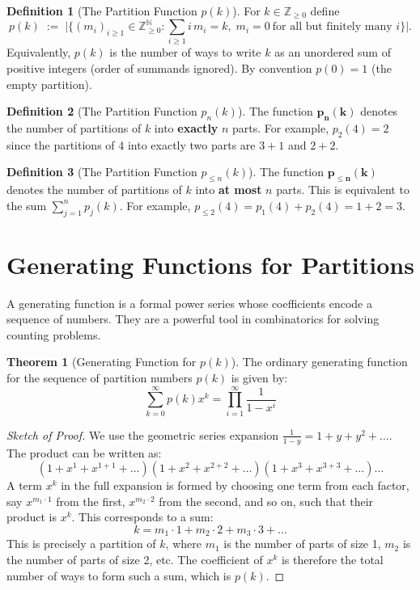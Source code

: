 \documentclass{article}
\theoremstyle{definition}
\newtheorem{definition}{Definition}
\newtheorem{theorem}{Theorem}
\begin{document}
\begin{definition}[The Partition Function $p(k)$]
  For $k\in\mathbb{Z}_{\ge0}$ define
  \[
    p(k)\;:=\;\Bigg|\Big\{(m_i)_{i\ge1}\in\mathbb{Z}_{\ge0}^{\mathbb{N}} :
    \sum_{i\ge1} i\,m_i = k,\; m_i=0\ \text{for all but finitely many }i\Big\}\Bigg|.
  \]
  Equivalently, $p(k)$ is the number of ways to write $k$ as an unordered sum of positive integers (order of summands ignored). By convention $p(0)=1$ (the empty partition).
\end{definition}

\begin{definition}[The Partition Function $p_n(k)$]
  The function $\boldsymbol{p_n(k)}$ denotes the number of partitions of $k$ into \textbf{exactly} $n$ parts. For example, $p_2(4)=2$ since the partitions of 4 into exactly two parts are $3+1$ and $2+2$.
\end{definition}

\begin{definition}[The Partition Function $p_{\le n}(k)$]
  The function $\boldsymbol{p_{\le n}(k)}$ denotes the number of partitions of $k$ into \textbf{at most} $n$ parts. This is equivalent to the sum $\sum_{j=1}^{n} p_j(k)$. For example, $p_{\le 2}(4) = p_1(4) + p_2(4) = 1 + 2 = 3$.
\end{definition}

\section{Generating Functions for Partitions}
A generating function is a formal power series whose coefficients encode a sequence of numbers. They are a powerful tool in combinatorics for solving counting problems.

\begin{theorem}[Generating Function for $p(k)$]
  The ordinary generating function for the sequence of partition numbers $p(k)$ is given by:
  $$ \sum_{k=0}^{\infty} p(k)x^k = \prod_{i=1}^{\infty} \frac{1}{1-x^i} $$
\end{theorem}

\begin{proof}[Sketch of Proof]
  We use the geometric series expansion $\frac{1}{1-y} = 1 + y + y^2 + \dots$.
  The product can be written as:
  $$ (1+x^1+x^{1+1}+\dots)(1+x^2+x^{2+2}+\dots)(1+x^3+x^{3+3}+\dots)\dots $$
  A term $x^k$ in the full expansion is formed by choosing one term from each factor, say $x^{m_1 \cdot 1}$ from the first, $x^{m_2 \cdot 2}$ from the second, and so on, such that their product is $x^k$. This corresponds to a sum:
  $$ k = m_1 \cdot 1 + m_2 \cdot 2 + m_3 \cdot 3 + \dots $$
  This is precisely a partition of $k$, where $m_1$ is the number of parts of size 1, $m_2$ is the number of parts of size 2, etc. The coefficient of $x^k$ is therefore the total number of ways to form such a sum, which is $p(k)$.
\end{proof}
\end{document}
